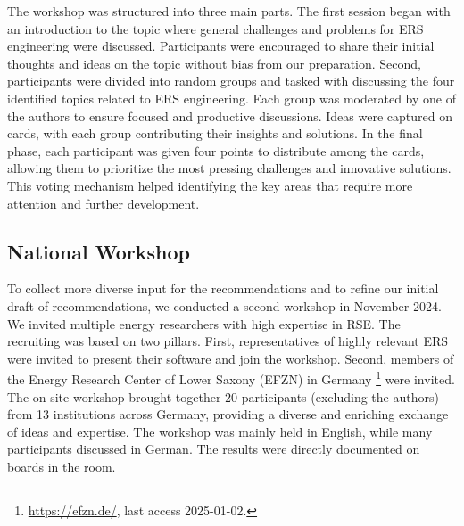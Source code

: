 The workshop was structured into three main parts. The first session began with an introduction to the topic where general challenges and problems for \ac{ERS} engineering were discussed. Participants were encouraged to share their initial thoughts and ideas on the topic without bias from our preparation. Second, participants were divided into random groups and tasked with discussing the four identified topics related to \ac{ERS} engineering. Each group was moderated by one of the authors to ensure focused and productive discussions. Ideas were captured on cards, with each group contributing their insights and solutions.
In the final phase, each participant was given four points to distribute among the cards, allowing them to prioritize the most pressing challenges and innovative solutions. This voting mechanism helped identifying the key areas that require more attention and further development. 

\subsection{National Workshop}
\label{subsec:ws2}
To collect more diverse input for the recommendations and to refine 
our initial draft of recommendations, we conducted a second workshop in November 2024. We invited multiple energy researchers with high expertise in \ac{RSE}. The recruiting was based on two pillars. First, representatives of highly relevant \ac{ERS} were invited to present their software and join the workshop. Second, members of the Energy Research Center of Lower Saxony (EFZN) in Germany \footnote{\url{https://efzn.de/}, last access 2025-01-02.} were invited. The on-site workshop brought together 20 participants (excluding the authors) from 13 institutions across Germany, providing a diverse and enriching exchange of ideas and expertise. The workshop was mainly held in English, while many participants discussed in German. The results were directly documented on boards in the room.


